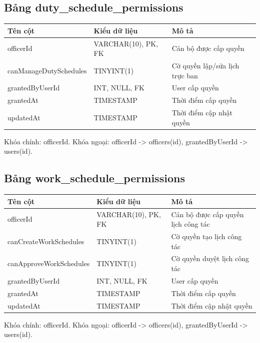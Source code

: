 \documentclass[18pt,a4paper]{report}
\begin{document}
\subsection{Bảng duty\_schedule\_permissions}
\begin{longtable}{|>{\raggedright\arraybackslash}p{4.5cm}|>{\raggedright\arraybackslash}p{4.5cm}|>{\raggedright\arraybackslash}p{6.5cm}|}
\hline
\textbf{Tên cột} & \textbf{Kiểu dữ liệu} & \textbf{Mô tả} \\ \hline
officerId & VARCHAR(10), PK, FK & Cán bộ được cấp quyền \\ \hline
canManageDutySchedules & TINYINT(1) & Cờ quyền lập/sửa lịch trực ban \\ \hline
grantedByUserId & INT, NULL, FK & User cấp quyền \\ \hline
grantedAt & TIMESTAMP & Thời điểm cấp quyền \\ \hline
updatedAt & TIMESTAMP & Thời điểm cập nhật quyền \\ \hline
\end{longtable}
Khóa chính: officerId. Khóa ngoại: officerId -> officers(id), grantedByUserId -> users(id).

\subsection{Bảng work\_schedule\_permissions}
\begin{longtable}{|>{\raggedright\arraybackslash}p{4.5cm}|>{\raggedright\arraybackslash}p{4.5cm}|>{\raggedright\arraybackslash}p{6.5cm}|}
\hline
\textbf{Tên cột} & \textbf{Kiểu dữ liệu} & \textbf{Mô tả} \\ \hline
officerId & VARCHAR(10), PK, FK & Cán bộ được cấp quyền lịch công tác \\ \hline
canCreateWorkSchedules & TINYINT(1) & Cờ quyền tạo lịch công tác \\ \hline
canApproveWorkSchedules & TINYINT(1) & Cờ quyền duyệt lịch công tác \\ \hline
grantedByUserId & INT, NULL, FK & User cấp quyền \\ \hline
grantedAt & TIMESTAMP & Thời điểm cấp quyền \\ \hline
updatedAt & TIMESTAMP & Thời điểm cập nhật quyền \\ \hline
\end{longtable}
Khóa chính: officerId. Khóa ngoại: officerId -> officers(id), grantedByUserId -> users(id).
\end{document}
